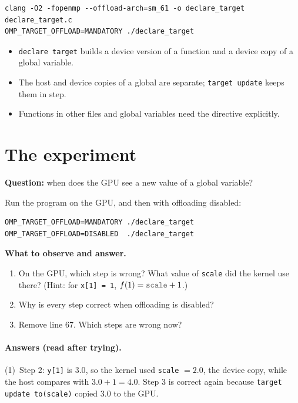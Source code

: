 \documentclass[11pt,a4paper]{article}
\let\origtexttt\texttt
\renewcommand{\texttt}[1]{\textcolor{black!60}{\origtexttt{#1}}}
\begin{document}
\begin{lstlisting}[style=sh]
clang -O2 -fopenmp --offload-arch=sm_61 -o declare_target declare_target.c
OMP_TARGET_OFFLOAD=MANDATORY ./declare_target
\end{lstlisting}

\begin{keyidea}
\begin{itemize}
  \item \texttt{declare target} builds a device version of a function and a device copy of a
        global variable.
  \item The host and device copies of a global are separate; \texttt{target update} keeps them
        in step.
  \item Functions in other files and global variables need the directive explicitly.
\end{itemize}
\end{keyidea}

\section{The experiment}
\begin{experiment}
\textbf{Question:} when does the GPU see a new value of a global variable?

Run the program on the GPU, and then with offloading disabled:
\begin{lstlisting}[style=sh]
OMP_TARGET_OFFLOAD=MANDATORY ./declare_target
OMP_TARGET_OFFLOAD=DISABLED  ./declare_target
\end{lstlisting}

\textbf{What to observe and answer.}
\begin{enumerate}
  \item On the GPU, which step is wrong? What value of \texttt{scale} did the kernel use there?
        (Hint: for \texttt{x[1] = 1}, $f(1) = \texttt{scale} + 1$.)
  \item Why is every step correct when offloading is disabled?
  \item Remove line 67. Which steps are wrong now?
\end{enumerate}
\end{experiment}

\paragraph{Answers (read after trying).}

\noindent(1)~Step 2: \texttt{y[1]} is $3.0$, so the kernel used \texttt{scale} $= 2.0$, the
device copy, while the host compares with $3.0 + 1 = 4.0$. Step 3 is correct again because
\texttt{target update to(scale)} copied $3.0$ to the GPU.
\end{document}
